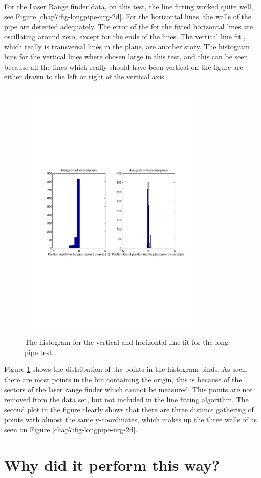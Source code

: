 For the Laser Range finder data, on this test, the line fitting worked quite well, see
Figure \ref{chap7:fig-longpipe-urg-2d}. For the horizontal lines, the walls of the pipe
are detected adequately. The error of the for the fitted horizontal lines are oscillating
around zero, except for the ends of the lines. The vertical line fit , which
really is transversal lines in the plane, are another story. The histogram bins for the
vertical lines where chosen large in this test, and this can be seen because all the lines
which really should have been vertical on the figure are either drawn to the left or right
of the vertical axis. 
\begin{figure}[htbp]
    \centering
    \includegraphics[width=0.8\textwidth]{pics/longpipe-urg-hist}
    \caption{The histogram for the vertical and horizontal line fit for the long pipe test}
    \label{chap8:fig-longpipe-urg-hist}
\end{figure}
Figure \ref{chap8:fig-longpipe-urg-hist} shows the distribution of the points in the
histogram binds. As seen, there are most points in the bin containing the origin, this is
because of the sectors of the laser range finder which cannot be measured. This points are
not removed from the data set, but not included in the line fitting algorithm. 
The second plot in the figure clearly shows that there are three distinct gathering of
points with almost the same y-coordinates, which makes up the three walls of as seen on
Figure \ref{chap7:fig-longpipe-urg-2d}.

\section{Why did it perform this way?}



